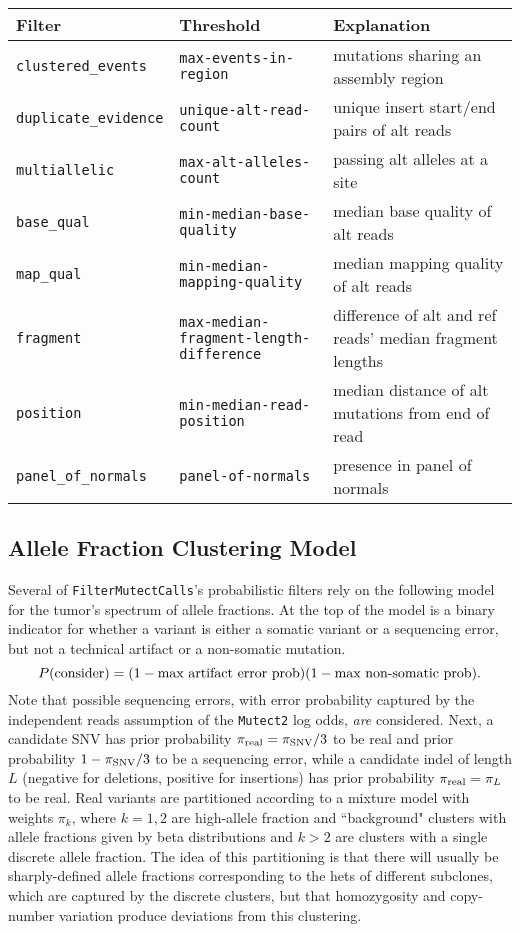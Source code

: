 \documentclass[nofootinbib,amssymb,amsmath]{revtex4}
\newcommand{\code}[1]{\texttt{#1}}
\begin{document}
\begin{table}[h!]
\centering
 \begin{tabular}{|| l l l ||} 
 \hline
 Filter & Threshold & Explanation \\ [0.5ex] 
 \hline\hline
 \code{clustered\_events} & \code{max-events-in-region} & mutations sharing an assembly region \\
 \code{duplicate\_evidence} & \code{unique-alt-read-count} & unique insert start/end pairs of alt reads \\
 \code{multiallelic} & \code{max-alt-alleles-count} & passing alt alleles at a site \\
 \code{base\_qual} & \code{min-median-base-quality} & median base quality of alt reads \\
 \code{map\_qual} & \code{min-median-mapping-quality} & median mapping quality of alt reads \\
 \code{fragment} & \code{max-median-fragment-length-difference} & difference of alt and ref reads' median fragment lengths \\
 \code{position} &\code{min-median-read-position} & median distance of alt mutations from end of read \\
 \code{panel\_of\_normals} & \code{panel-of-normals}  & presence in panel of normals \\
 \hline
 \end{tabular}
\end{table}

\subsection{Allele Fraction Clustering Model}
Several of \code{FilterMutectCalls}'s probabilistic filters rely on the following model for the tumor's spectrum of allele fractions.  At the top of the model is a binary indicator for whether a variant is either a somatic variant or a sequencing error, but not a technical artifact or a non-somatic mutation.
\begin{equation}
P({\rm consider}) = (1 - \textrm{max artifact error prob})(1 - \textrm{max non-somatic prob}).
\end{equation}
Note that possible sequencing errors, with error probability captured by the independent reads assumption of the \code{Mutect2} log odds, \textit{are} considered.  Next, a candidate SNV has prior probability $\pi_{\rm real} = \pi_{\rm SNV} / 3$ to be real and prior probability $1 - \pi_{\rm SNV}/3$ to be a sequencing error, while a candidate indel of length $L$ (negative for deletions, positive for insertions) has prior probability $\pi_{\rm real} = \pi_L$ to be real.  Real variants are partitioned according to a mixture model with weights $\pi_k$, where $k=1,2$ are high-allele fraction and ``background" clusters with allele fractions given by beta distributions and $k > 2$ are clusters with a single discrete allele fraction.  The idea of this partitioning is that there will usually be sharply-defined allele fractions corresponding to the hets of different subclones, which are captured by the discrete clusters, but that homozygosity and copy-number variation produce deviations from this clustering.
\end{document}
